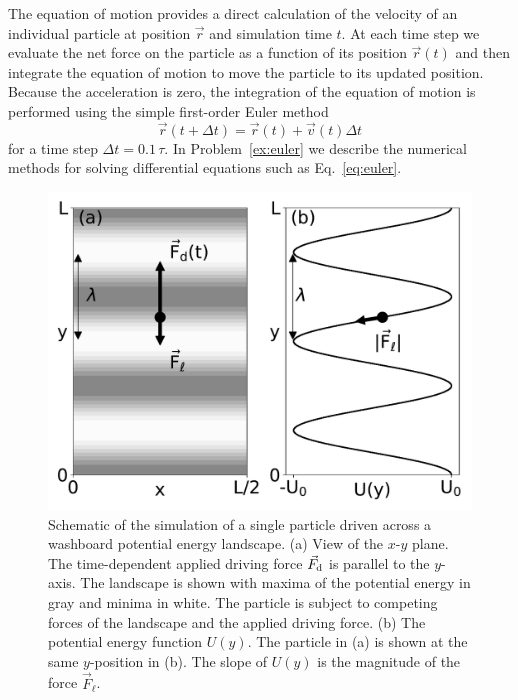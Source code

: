 \documentclass[preprint,showpacs,preprintnumbers,amsmath,amssymb,aps,prb]{revtex4-1}
\theoremstyle{remark}
\begin{document}
The equation of motion provides a direct calculation of the velocity
of an individual particle at position $\vec{r}$ 
and simulation time $t$. At each time step
we evaluate the net force on the particle as a function of its position
$\vec{r}(t)$
and then integrate
the equation of motion to move the particle
to its updated position.
Because the acceleration is zero,
the integration of the equation of motion
is performed using 
the simple first-order Euler method 
\begin{equation}
  \vec{r}(t+\Delta t) = \vec{r}(t) + \vec{v}(t) \Delta t
    \label{eq:euler}
\end{equation}
for a time step $\Delta t = 0.1\,\tau$.
In 
Problem~\ref{ex:euler}
we describe 
the numerical methods for 
solving differential equations such as Eq.~\eqref{eq:euler}.
\begin{figure} %
\centering
\includegraphics[width=\columnwidth]{fig1_landscape.pdf}
\caption{
Schematic of the simulation of a single particle
  driven across a washboard potential energy landscape.
  (a) View of the $x$-$y$ plane. 
  The time-dependent applied driving force $\vec{F}_{\rm d}$
  is parallel to the $y$-axis.
  The landscape is shown with
  maxima of the potential energy in gray 
  and minima in white. 
  The particle is 
  subject to competing forces of the landscape and the applied driving force.
  (b) The potential energy function $U(y)$. 
  The particle in (a) is shown at the same $y$-position in (b).
  The slope of $U(y)$ is the 
  magnitude of the force $\vec{F}_{\ell}$. 
  }
\label{fig:1_landscape}
\end{figure}
\end{document}
